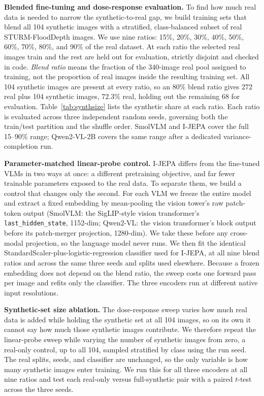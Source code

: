 \documentclass[conference]{IEEEtran}
\begin{document}
\textbf{Blended fine-tuning and dose-response evaluation.} To find how much real data is needed to narrow the synthetic-to-real gap, we build training sets that blend all 104 synthetic images with a stratified, class-balanced subset of real STURM-FloodDepth images. We use nine ratios: 15\%, 20\%, 30\%, 40\%, 50\%, 60\%, 70\%, 80\%, and 90\% of the real dataset. At each ratio the selected real images train and the rest are held out for evaluation, strictly disjoint and checked in code. \emph{Blend ratio} means the fraction of the 340-image real pool assigned to training, not the proportion of real images inside the resulting training set. All 104 synthetic images are present at every ratio, so an 80\% blend ratio gives 272 real plus 104 synthetic images, 72.3\% real, holding out the remaining 68 for evaluation. Table~\ref{tab:synthsize} lists the synthetic share at each ratio. Each ratio is evaluated across three independent random seeds, governing both the train/test partition and the shuffle order. SmolVLM and I-JEPA cover the full 15--90\% range; Qwen2-VL-2B covers the same range after a dedicated variance-completion run.

\textbf{Parameter-matched linear-probe control.} I-JEPA differs from the fine-tuned VLMs in two ways at once: a different pretraining objective, and far fewer trainable parameters exposed to the real data. To separate them, we build a control that changes only the second. For each VLM we freeze the entire model and extract a fixed embedding by mean-pooling the vision tower's raw patch-token output (SmolVLM: the SigLIP-style vision transformer's \texttt{last\_hidden\_state}, 1152-dim; Qwen2-VL: the vision transformer's block output before its patch-merger projection, 1280-dim). We take these before any cross-modal projection, so the language model never runs. We then fit the identical StandardScaler-plus-logistic-regression classifier used for I-JEPA, at all nine blend ratios and across the same three seeds and splits used elsewhere. Because a frozen embedding does not depend on the blend ratio, the sweep costs one forward pass per image and refits only the classifier. The three encoders run at different native input resolutions.

\textbf{Synthetic-set size ablation.} The dose-response sweep varies how much real data is added while holding the synthetic set at all 104 images, so on its own it cannot say how much those synthetic images contribute. We therefore repeat the linear-probe sweep while varying the number of synthetic images from zero, a real-only control, up to all 104, sampled stratified by class using the run seed. The real splits, seeds, and classifier are unchanged, so the only variable is how many synthetic images enter training. We run this for all three encoders at all nine ratios and test each real-only versus full-synthetic pair with a paired $t$-test across the three seeds.
\end{document}
